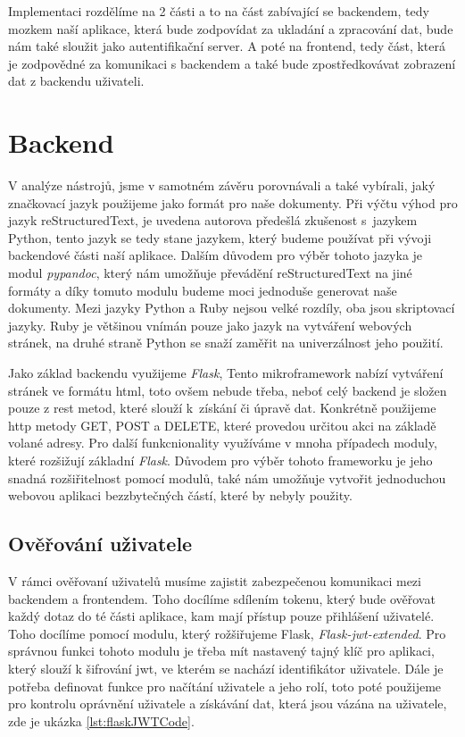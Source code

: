 Implementaci rozdělíme na 2 části a to na část zabívající se backendem, tedy mozkem naší aplikace, která bude zodpovídat
za ukladání a zpracování dat, bude nám také sloužit jako autentifikační server. A poté na frontend, tedy část, která
je zodpovědné za komunikaci s backendem a také bude zpostředkovávat zobrazení dat z backendu uživateli.

\section{Backend}

V analýze nástrojů, jsme v samotném závěru porovnávali a také vybírali, jaký značkovací jazyk použijeme jako formát pro naše dokumenty.
Při výčtu výhod pro jazyk reStructuredText, je uvedena autorova předešlá zkušenost s~jazykem Python, tento jazyk se tedy stane jazykem,
který budeme používat při vývoji backendové části naší aplikace.
Dalším důvodem pro výběr tohoto jazyka je modul \textit{pypandoc},
který nám umožňuje převádění reStructuredText na jiné formáty a díky tomuto modulu budeme moci jednoduše generovat naše dokumenty. Mezi jazyky
Python a Ruby nejsou velké rozdíly, oba jsou skriptovací jazyky. Ruby je většinou vnímán pouze jako jazyk na vytváření webových stránek, na druhé straně
Python se snaží zaměřit na univerzálnost jeho použití. \cite{pythonRubyFight}

Jako základ backendu využijeme \textit{Flask},  \cite{flaskDoc}
Tento mikroframework nabízí vytváření stránek ve formátu \gls{html}, toto ovšem \mbox{nebude} třeba, \mbox{neboť} celý backend je složen pouze z \gls{rest} metod,
které slouží k~získání či úpravě dat. Konkrétně použijeme \gls{http} metody GET, POST a DELETE, které provedou určitou akci na základě volané adresy.
Pro další funkcnionality využíváme v mnoha případech moduly, které rozšižují základní \textit{Flask}. Důvodem pro výběr tohoto frameworku
je jeho snadná rozšiřitelnost pomocí modulů, také nám umožňuje vytvořit jednoduchou webovou aplikaci bez\linebreak zbytečných částí, které by nebyly použity.

\subsection{Ověřování uživatele}

V rámci ověřovaní uživatelů musíme zajistit zabezpečenou komunikaci mezi backendem a frontendem. Toho docílíme sdílením tokenu, který bude ověřovat
každý dotaz do té části aplikace, kam mají přístup pouze přihlášení uživatelé. Toho docílíme pomocí modulu, který rožšiřujeme Flask,
\textit{Flask-jwt-extended}. Pro správnou funkci tohoto modulu je třeba mít nastavený tajný klíč pro aplikaci, který slouží k šifrování \gls{jwt},
ve kterém se nachází identifikátor uživatele. Dále je potřeba definovat funkce pro načítání uživatele a jeho rolí, toto poté použijeme pro kontrolu
oprávnění uživatele a získávání dat, která jsou vázána na uživatele, zde je ukázka \ref{lst:flaskJWTCode}.

